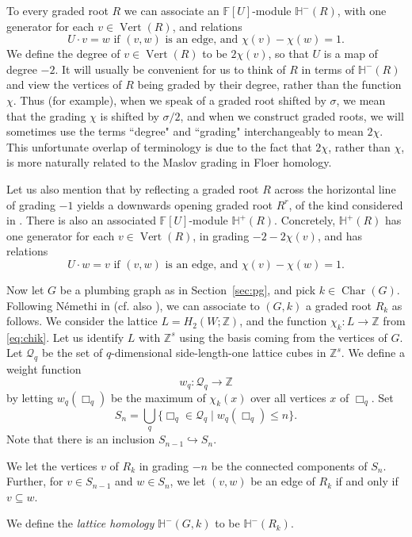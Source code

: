 \documentclass[11 pt]{amsart}
\theoremstyle{remark}
\newcommand\Z{\mathbb{Z}}
\def\ff {{\mathbb{F}}}
\def\He{\mathbb{H}}
\def\Vert{\operatorname{Vert}}
\def\Char{\operatorname{Char}}
\def\cQ{\mathcal{Q}}
\begin{document}
To every graded root $R$ we can associate an $\ff[U]$-module $\He^-(R)$, with one generator for each $v \in \Vert(R)$, and relations
$$ U \cdot v = w \text{ if } (v, w) \text{ is an edge, and } \chi(v) - \chi(w)=1.$$
We define the degree of $v \in \Vert(R)$ to be $2\chi(v)$, so that $U$ is a map of degree $-2$. It will usually be convenient for us to think of $R$ in terms of $\He^-(R)$ and view the vertices of $R$ being graded by their degree, rather than the function $\chi$. Thus (for example), when we speak of a graded root shifted by $\sigma$, we mean that the grading $\chi$ is shifted by $\sigma/2$, and when we construct graded roots, we will sometimes use the terms ``degree" and ``grading" interchangeably to mean $2\chi$. This unfortunate overlap of terminology is due to the fact that $2\chi$, rather than $\chi$, is more naturally related to the Maslov grading in Floer homology. 

Let us also mention that by reflecting a graded root $R$ across the horizontal line of grading $-1$ yields a downwards opening graded root $R^r$, of the kind considered in \cite{NemethiOS}. There is also an associated $\ff[U]$-module $\He^+(R)$. Concretely, $\He^+(R)$ has one generator for each $v \in \Vert(R)$, in grading $-2-2\chi(v)$, and has relations
$$ U \cdot w = v \text{ if } (v, w) \text{ is an edge, and } \chi(v) - \chi(w)=1.$$

Now let $G$ be a plumbing graph as in Section~\ref{sec:pg}, and pick $k \in \Char(G)$. Following N{\'e}methi in \cite{NemethiOS, Nem} (cf. also \cite[Section 1.2]{Dai}), we can associate to $(G, k)$ a graded root $R_k$ as follows. We consider the lattice $L=H_2(W; \Z)$, and the function $\chi_k: L \to \Z$ from \eqref{eq:chik}. Let us identify $L$ with $\Z^s$ using the basis coming from the vertices of $G$. Let $\cQ_q$ be the set of $q$-dimensional side-length-one lattice cubes in $\Z^s$. We define a weight function 
$$ w_q: \cQ_q \to \Z$$
by letting  $w_q(\Box_q)$ be the maximum of $\chi_k(x)$ over all vertices $x$ of $\Box_q$. Set
$$ S_{n} = \bigcup_q \{\Box_q \in \cQ_q \mid w_q(\Box_q) \leq n\}.$$
Note that there is an inclusion $S_{n-1} \hookrightarrow S_n$. 

We let the vertices $v$ of $R_k$ in grading $-n$ be the connected components of $S_n$. Further, for $v \in S_{n-1}$ and $w \in S_n$, we let $(v,w)$ be an edge of $R_k$ if and only if $v \subseteq w$.

We define the {\em lattice homology} $\He^-(G, k)$ to be $\He^-(R_k)$. 
\end{document}
